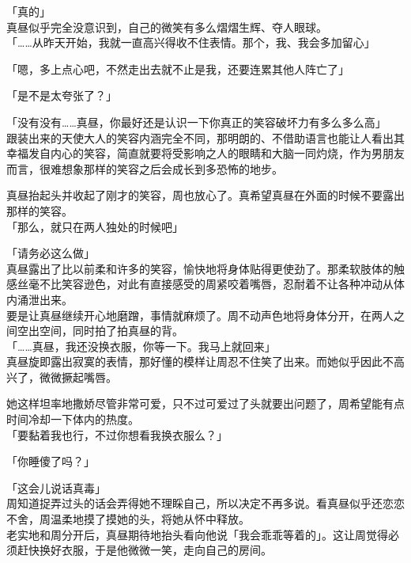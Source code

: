 「真的」\\

真昼似乎完全没意识到，自己的微笑有多么熠熠生辉、夺人眼球。\\

「……从昨天开始，我就一直高兴得收不住表情。那个，我、我会多加留心」

「嗯，多上点心吧，不然走出去就不止是我，还要连累其他人阵亡了」

「是不是太夸张了？」

「没有没有……真昼，你最好还是认识一下你真正的笑容破坏力有多么多么高」\\

跟装出来的天使大人的笑容内涵完全不同，那明朗的、不借助语言也能让人看出其幸福发自内心的笑容，简直就要将受影响之人的眼睛和大脑一同灼烧，作为男朋友而言，很难想象那样的笑容之后会成长到多恐怖的地步。

真昼抬起头并收起了刚才的笑容，周也放心了。真希望真昼在外面的时候不要露出那样的笑容。\\

「那么，就只在两人独处的时候吧」

「请务必这么做」\\

真昼露出了比以前柔和许多的笑容，愉快地将身体贴得更使劲了。那柔软肢体的触感丝毫不比笑容逊色，对此有直接感受的周紧咬着嘴唇，忍耐着不让各种冲动从体内涌泄出来。\\

要是让真昼继续开心地磨蹭，事情就麻烦了。周不动声色地将身体分开，在两人之间空出空间，同时拍了拍真昼的背。\\

「……真昼，我还没换衣服，你等一下。我马上就回来」\\

真昼旋即露出寂寞的表情，那好懂的模样让周忍不住笑了出来。而她似乎因此不高兴了，微微撅起嘴唇。

她这样坦率地撒娇尽管非常可爱，只不过可爱过了头就要出问题了，周希望能有点时间冷却一下体内的热度。\\

「要黏着我也行，不过你想看我换衣服么？」

「你睡傻了吗？」

「这会儿说话真毒」\\

周知道捉弄过头的话会弄得她不理睬自己，所以决定不再多说。看真昼似乎还恋恋不舍，周温柔地摸了摸她的头，将她从怀中释放。\\

老实地和周分开后，真昼期待地抬头看向他说「我会乖乖等着的」。这让周觉得必须赶快换好衣服，于是他微微一笑，走向自己的房间。\\

